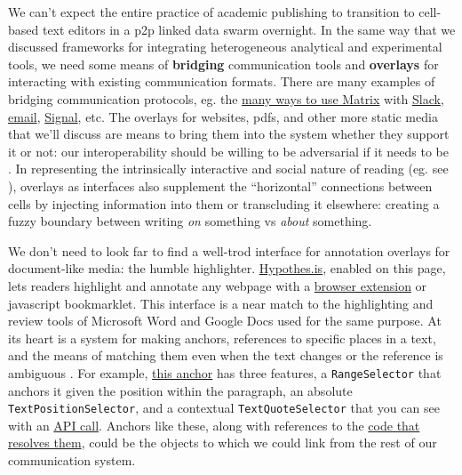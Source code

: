 We can't expect the entire practice of academic publishing to transition
to cell-based text editors in a p2p linked data swarm overnight. In the
same way that we discussed frameworks for integrating heterogeneous
analytical and experimental tools, we need some means of
\textbf{bridging} communication tools and \textbf{overlays} for
interacting with existing communication formats. There are many examples
of bridging communication protocols, eg. the
\href{https://matrix.org/bridges/}{many ways to use Matrix} with
\href{https://matrix.org/bridges/\#slack}{Slack},
\href{https://matrix.org/bridges/\#email}{email},
\href{https://matrix.org/bridges/\#signal}{Signal}, etc. The overlays
for websites, pdfs, and other more static media that we'll discuss are
means to bring them into the system whether they support it or not: our
interoperability should be willing to be adversarial if it needs to be
\citep{doctorowAdversarialInteroperabilityReviving2019, doctorowAdversarialInteroperability2019} . In representing the
intrinsically interactive and social nature of reading (eg. see \citep{jacksonMarginaliaReadersWriting2001} ), overlays as interfaces
also supplement the ``horizontal'' connections between cells by
injecting information into them or transcluding it elsewhere: creating a
fuzzy boundary between writing \emph{on} something vs \emph{about}
something.

We don't need to look far to find a well-trod interface for annotation
overlays for document-like media: the humble highlighter.
\href{https://hypothes.is}{Hypothes.is}, enabled on this page, lets
readers highlight and annotate any webpage with a
\href{https://chrome.google.com/webstore/detail/hypothesis-web-pdf-annota/bjfhmglciegochdpefhhlphglcehbmek}{browser
extension} or javascript bookmarklet. This interface is a near match to
the highlighting and review tools of Microsoft Word and Google Docs used
for the same purpose. At its heart is a system for making anchors,
references to specific places in a text, and the means of matching them
even when the text changes or the reference is ambiguous \citep{csillagFuzzyAnchoring2013} . For example,
\href{https://hypothes.is/a/oLw4uk7_Eeyt5N-FVlE3fw}{this anchor} has
three features, a \texttt{RangeSelector} that anchors it given the
position within the paragraph, an absolute
\texttt{TextPositionSelector}, and a contextual
\texttt{TextQuoteSelector} that you can see with an
\href{https://api.hypothes.is/api/annotations/oLw4uk7_Eeyt5N-FVlE3fw}{API
call}. Anchors like these, along with references to the
\href{https://github.com/hypothesis/client/blob/fb08cdf38191643d7a35d84ca3b822589c2e880a/src/annotator/anchoring/types.js}{code
that resolves them}, could be the objects to which we could link from
the rest of our communication system.

